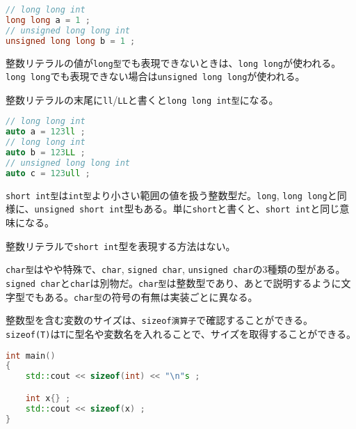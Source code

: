 \begin{lstlisting}[language={C++}]
// long long int
long long a = 1 ;
// unsigned long long int
unsigned long long b = 1 ;
\end{lstlisting}

整数リテラルの値が\texttt{long型}でも表現できないときは、\texttt{long long}が使われる。\texttt{long long}でも表現できない場合は\texttt{unsigned long long}が使われる。

整数リテラルの末尾に\texttt{ll}/\texttt{LL}と書くと\texttt{long long int型}になる。

\begin{lstlisting}[language={C++}]
// long long int
auto a = 123ll ;
// long long int
auto b = 123LL ;
// unsigned long long int
auto c = 123ull ;
\end{lstlisting}


\texttt{short int型}は\texttt{int型}より小さい範囲の値を扱う整数型だ。\texttt{long}, \texttt{long long}と同様に、\texttt{unsigned short int}型もある。単に\texttt{short}と書くと、\texttt{short int}と同じ意味になる。

整数リテラルで\texttt{short int}型を表現する方法はない。


\texttt{char型}はやや特殊で、\texttt{char}, \texttt{signed char}, \texttt{unsigned char}の3種類の型がある。\texttt{signed char}と\texttt{char}は別物だ。\texttt{char型}は整数型であり、あとで説明するように文字型でもある。\texttt{char型}の符号の有無は実装ごとに異なる。


整数型を含む変数のサイズは、\texttt{sizeof演算子}で確認することができる。\texttt{sizeof(T)}は\texttt{T}に型名や変数名を入れることで、サイズを取得することができる。

\begin{lstlisting}[language={C++}]
int main()
{
    std::cout << sizeof(int) << "\n"s ;

    int x{} ;
    std::cout << sizeof(x) ;
}
\end{lstlisting}

